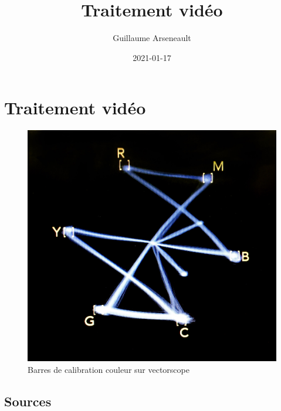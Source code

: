 \documentclass[
]{book}
\title{Traitement vidéo}
\author{Guillaume Arseneault}
\date{2021-01-17}
\begin{document}
\maketitle

{
\setcounter{tocdepth}{1}
\tableofcontents
}
\hypertarget{traitement-viduxe9o}{%
\chapter{Traitement vidéo}\label{traitement-viduxe9o}}

\begin{figure}
\centering
\includegraphics{images/vectorscope.jpg}
\caption{\label{fig:unnamed-chunk-1}Barres de calibration couleur sur vectorscope \citep{marsh_ColorBarsVectorscope_2016}}
\end{figure}

\hypertarget{sources}{%
\section{Sources}\label{sources}}
\end{document}
